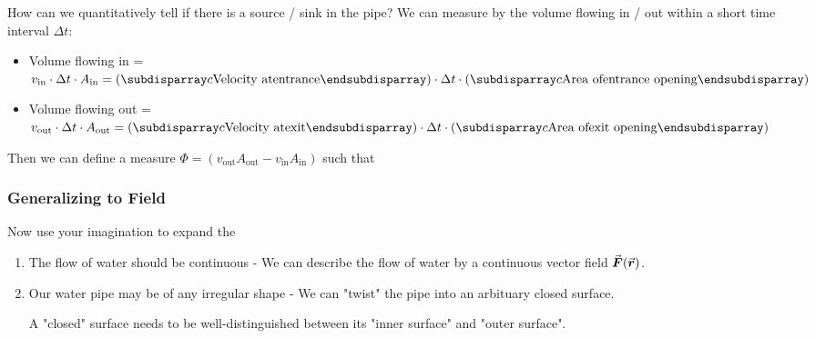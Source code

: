 \documentclass[class=article, crop=false, 12pt]{standalone}
\begin{document}
How can we quantitatively tell if there is a source / sink in the pipe?
We can measure by the volume flowing in / out within a short time interval $\Delta t$:
\begin{itemize}
    \item Volume flowing in = $v_\text{in}\cdot \Delta t \cdot A_\text{in} 
    = \qty(\mstack{\text{Velocity at}\\\text{entrance}})\cdot \Delta t \cdot \qty(\mstack{\text{Area of}\\\text{entrance opening}})$

    \item Volume flowing out = $v_\text{out}\cdot \Delta t \cdot A_\text{out}
     = \qty(\mstack{\text{Velocity at}\\\text{exit}})\cdot \Delta t \cdot \qty(\mstack{\text{Area of}\\\text{exit opening}})$
\end{itemize}

Then we can define a measure $\Phi = (v_\text{out}A_\text{out} - v_\text{in}A_\text{in})$
such that

\subsubsection{Generalizing to Field}

Now use your imagination to expand the 

\begin{enumerate}
    \item The flow of water should be continuous - 
    We can describe the flow of water by a continuous vector field $\va*{F}(\va*{r})$.
    

    \item Our water pipe may be of any irregular shape - 
    We can "twist" the pipe into an arbituary closed surface.


    A "closed" surface needs to be well-distinguished between its
    "inner surface" and "outer surface".

\end{enumerate}
\end{document}
